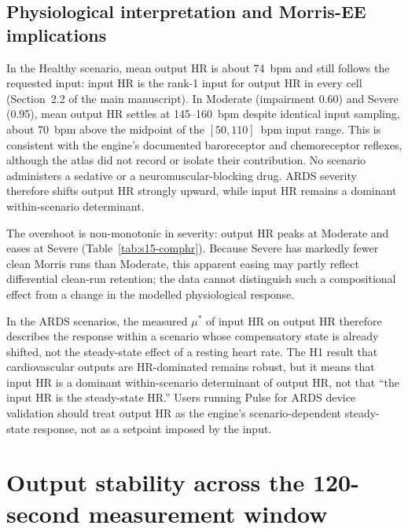 \documentclass[pdflatex,sn-nature]{sn-jnl}%
\newcommand{\mainref}[2]{#2}
\begin{document}
\subsection{Physiological interpretation and Morris-EE implications}\label{sec:s15-mechanism}

In the Healthy scenario, mean output HR is about 74~bpm and still follows the requested input: input HR is the rank-1 input for output HR in every cell (Section~\mainref{sec:results-morris}{2.2} of the main manuscript). In Moderate (impairment 0.60) and Severe (0.95), mean output HR settles at 145--160~bpm despite identical input sampling, about 70~bpm above the midpoint of the $[50, 110]$~bpm input range. This is consistent with the engine's documented baroreceptor and chemoreceptor reflexes, although the atlas did not record or isolate their contribution. No scenario administers a sedative or a neuromuscular-blocking drug. ARDS severity therefore shifts output HR strongly upward, while input HR remains a dominant within-scenario determinant.

The overshoot is non-monotonic in severity: output HR peaks at Moderate and eases at Severe (Table~\ref{tab:s15-comphr}). Because Severe has markedly fewer clean Morris runs than Moderate, this apparent easing may partly reflect differential clean-run retention; the data cannot distinguish such a compositional effect from a change in the modelled physiological response.

In the ARDS scenarios, the measured $\mu^{*}$ of input HR on output HR therefore describes the response within a scenario whose compensatory state is already shifted, not the steady-state effect of a resting heart rate. The H1 result that cardiovascular outputs are HR-dominated remains robust, but it means that input HR is a dominant within-scenario determinant of output HR, not that ``the input HR is the steady-state HR.'' Users running Pulse for ARDS device validation should treat output HR as the engine's scenario-dependent steady-state response, not as a setpoint imposed by the input.



\section{Output stability across the 120-second measurement window}\label{sec:s16-window}
\end{document}
